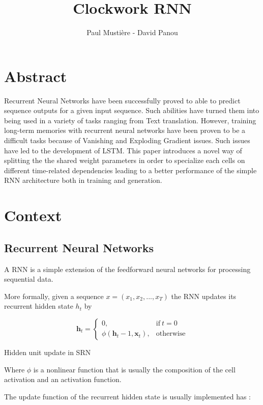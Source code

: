 \documentclass[a4paper,10pt]{article}
\title{Clockwork RNN}
\author{Paul Mustière - David Panou}
\begin{document}
\maketitle

\section{Abstract}

Recurrent Neural Networks have been successfully proved to able to predict sequence outputs for a given input sequence. Such abilities have turned them into being used in a variety of tasks ranging from Text translation.
However, training long-term memories with recurrent neural networks have been proven to be a difficult tasks because of Vanishing and Exploding Gradient issues. Such issues have led to the development of LSTM.
This paper introduces a novel way of  splitting the the shared weight parameters in order to specialize each cells on different time-related dependencies leading to a better performance of the simple RNN architecture both in training and generation.

\section{Context}
\subsection{Recurrent Neural Networks}

A RNN \cite{srn} is a simple extension of the feedforward neural networks for processing sequential data.

More formally, given a sequence $x = (x_1,x_2,...,x_T)$ the RNN updates its recurrent hidden state $h_t$ by 

\begin{mycapequ}
\begin{equation}
 \textbf{h}_t = 
 \begin{cases}
	0, & \text{if}\ t = 0 \\
	\phi(\textbf{h}_t-1,\textbf{x}_t), & \text{otherwise}
\end{cases}
\end{equation}
\caption{Hidden unit update in SRN}
\end{mycapequ}

Where $\phi$ is a nonlinear function that is usually the composition of the cell activation and an activation function.

The update function of the recurrent hidden state is usually implemented has :
\end{document}
